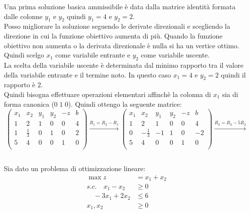 \documentclass{article}
\begin{document}
Una prima soluzione basica ammissibile è data dalla matrice identità formata 
dalle colonne $y_1$ e $y_2$ quindi $y_1=4$ e $y_2=2$.\\
Posso migliorare la soluzione seguendo le derivate direzionali e scegliendo la 
direzione in cui la funzione obiettivo aumenta di più. Quando la funzione 
obiettivo non aumenta o la derivata direzionale è nulla si ha un vertice ottimo.\\ 
Quindi scelgo $x_1$ come variabile entrante e $y_2$ come variabile uscente.\\

La scelta della variabile uscente è determinata dal minimo rapporto tra il valore  
della variabile entrante e il termine noto. In questo caso $x_1=4$ e $y_2=2$ 
quindi il rapporto è $2$.\\

Quindi bisogna effettuare operazioni elementari affinchè la colonna di $x_1$ 
sia di forma canonica ($0\; 1\; 0$). Quindi ottengo la seguente matrice:
\begin{equation*}
  \begin{pmatrix}
    x_1 & x_2 & y_1 & y_2 & -z & b\\
    1 & 2 & 1 & 0 & 0 & 4\\ 
    1 & \frac{1}{3} & 0 & 1 & 0 & 2\\ 
    5 & 4 & 0 & 0 & 1 & 0\\ 
  \end{pmatrix}
  \xrightarrow{R_1 = R_2 - R_1}
  \begin{pmatrix}
    x_1 & x_2 & y_1 & y_2 & -z & b\\
    1 & 2 & 1 & 0 & 0 & 4\\ 
    0 & -\frac{1}{3} & -1 & 1 & 0 & -2\\ 
    5 & 4 & 0 & 0 & 1 & 0\\ 
  \end{pmatrix}
  \xrightarrow{R_3 = R_3 - 5R_2}
\end{equation*}


\subsection{}
Sia dato un problema di ottimizzazione lineare:
\begin{align*}
  \max z &= x_1 + x_2 \\
  s.c. \quad x_1 - x_2 &\geq 0\\ 
  \quad -3x_1 + 2x_2 &\leq 6\\
  x_1, x_2 &\geq 0
\end{align*}
\end{document}
